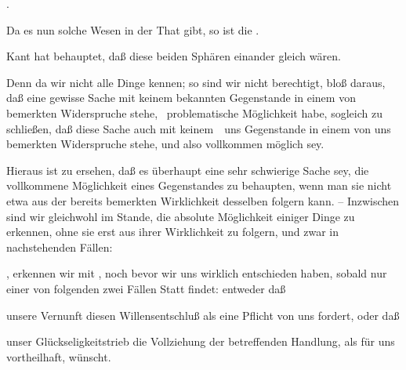 \begin{aufza}
\item {}.
\item Da es nun solche Wesen in der That gibt, so ist die .
\begin{RWanm}
Kant hat behauptet, daß diese beiden Sphären einander gleich wären.
\end{RWanm}
\item {} Denn da wir nicht alle Dinge kennen; so sind wir nicht berechtigt, bloß daraus, daß eine gewisse Sache mit keinem  bekannten Gegenstande in einem von  bemerkten Widerspruche stehe, \di\ problematische Möglichkeit habe, sogleich zu schließen, daß diese Sache auch mit keinem~\ uns  Gegenstande in einem von uns  bemerkten Widerspruche stehe, und also vollkommen möglich sey.
\item Hieraus ist zu ersehen, daß es überhaupt eine sehr schwierige Sache sey, die vollkommene Möglichkeit eines Gegenstandes zu behaupten, wenn man sie nicht etwa aus der bereits bemerkten Wirklichkeit desselben folgern kann. -- Inzwischen sind wir gleichwohl im Stande, die absolute Möglichkeit einiger Dinge zu erkennen, ohne sie erst aus ihrer Wirklichkeit zu folgern, und zwar in nachstehenden Fällen:
\begin{aufzb}
\item {}, erkennen wir mit , noch bevor wir uns wirklich entschieden haben, sobald nur einer von folgenden zwei Fällen Statt findet: entweder daß
\begin{aufzc}
\item unsere Vernunft diesen Willensentschluß als eine Pflicht von uns fordert, oder daß
\item unser Glückseligkeitstrieb die Vollziehung der betreffenden Handlung, als für uns vortheilhaft, wünscht.
\end{aufzc}

\end{aufzb}
\end{aufza}

